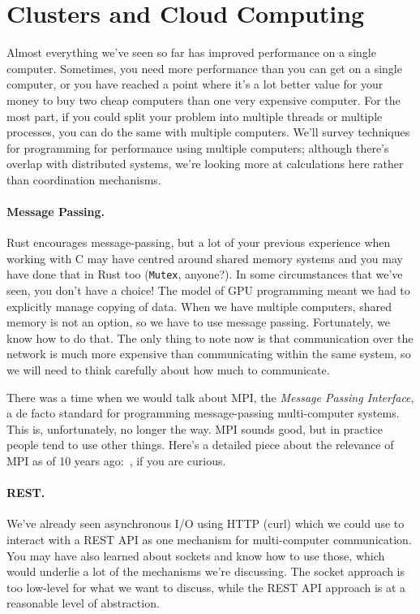 




\section*{Clusters and Cloud Computing}
Almost everything we've seen so far has improved performance on a single
computer. Sometimes, you need more performance than you can get on a
single computer, or you have reached a point where it's a lot better value for
your money to buy two cheap computers than one very expensive computer.
For the most part, if you could split your problem into
multiple threads or multiple processes, you can do the same with multiple
computers. We'll survey techniques for programming for
performance using multiple computers; although there's overlap with
distributed systems, we're looking more at calculations here rather than coordination mechanisms.

\paragraph*{Message Passing.} Rust encourages message-passing, but
a lot of your previous experience when working with C may have centred around
shared memory systems and you may have done that in Rust too (\texttt{Mutex}, 
anyone?). In some circumstances that we've seen, you don't have a choice!
The model of GPU programming meant we had to explicitly
manage copying of data. When we have multiple computers, shared memory is not
an option, so we have to use message passing. Fortunately, we know how to do
that. The only thing to note now is that communication over the network is
much more expensive than communicating within the same system, so we will
need to think carefully about how much to communicate.

There was a time when we would talk about MPI, the \emph{Message Passing 
Interface}, a de facto standard for programming message-passing
multi-computer systems. This is, unfortunately, no longer the way. 
MPI sounds good, but in practice people tend to use other things. 
Here's a detailed piece about the relevance of MPI as of 10 years ago:~\cite{hpcmpi}, if 
you are curious. 

\paragraph{REST.}
We've already seen asynchronous I/O using HTTP (curl) which we could use to
interact with a REST API as one mechanism for multi-computer communication. You
may have also learned about sockets and know how to use those, which would
underlie a lot of the mechanisms we're discussing. The socket approach is too
low-level for what we want to discuss, while the REST API approach is at a
reasonable level of abstraction. 

